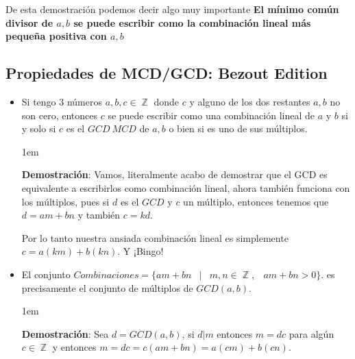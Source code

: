 \documentclass[12pt, fleqn]{report}                             %
\newenvironment{SmallIndentation}[1][0.75em]                    %
    {\begin{adjustwidth}{#1}{}\begin{footnotesize}}                 %
    {\end{footnotesize}\end{adjustwidth}}                           %
\DeclareMathOperator \Space {\quad}                             %
\DeclareMathOperator \MiniSpace {\;}                            %
\newcommand \Such {\MiniSpace|\MiniSpace}                       %
\DeclareMathOperator \Integers  {\mathbb{Z}}                     %
\begin{document}
            De esta demostración podemos decir algo muy importante \textbf{El mínimo común divisor de $a, b$
            se puede escribir como la combinación lineal más pequeña positiva con $a, b$}

        \clearpage
        \subsection{Propiedades de MCD/GCD: Bezout Edition}
            \begin{itemize}

                \item Si tengo 3 números $a, b, c \in \Integers$ donde $c$ y alguno de los
                dos restantes $a,b$ no son cero, entonces $c$ se puede escribir como
                una combinación lineal de $a$ y $b$ si y solo si $c$ es el $GCD \ MCD$ de
                $a, b$ o bien si es uno de sus múltiplos.

                    \begin{SmallIndentation}[1em]
                        \textbf{Demostración}:
                            Vamos, literalmente acabo de demostrar que el GCD es equivalente
                            a escribirlos como combinación lineal, ahora también funciona con
                            los múltiplos, pues si $d$ es el $GCD$ y $c$ un múltiplo, entonces
                            tenemos que $d=am+bn$ y también $c=kd$.

                            Por lo tanto nuestra ansiada combinación lineal es simplemente
                            $c=a(km)+b(kn)$. Y ¡Bingo!

                    \end{SmallIndentation} 


                \item El conjunto $Combinaciones = \{ am+bn \Such m, n \in \Integers, \MiniSpace am+bn > 0 \}$.
                es precisamente el conjunto de múltiplos de $GCD(a,b)$.

                    \begin{SmallIndentation}[1em]
                        \textbf{Demostración}:
                            Sea $d=GCD(a,b)$, si $d|m$ entonces $m = dc$ para algún $c \in \Integers$
                            y entonces $m = dc = c(am+bn)=a(cm)+b(cn)$.


\end{SmallIndentation}
\end{itemize}
\end{document}
